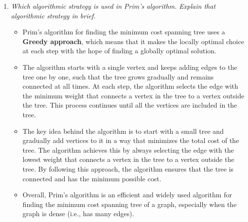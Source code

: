 \documentclass[11pt]{article}
\begin{document}
\begin{enumerate}
    \item \textit{ Which algorithmic strategy is used in Prim's algorithm. Explain that algorithmic strategy in brief.}\\

          \begin{itemize}
              \item Prim's algorithm for finding the minimum cost spanning tree uses a \textbf{Greedy approach}, which means that it makes the locally optimal choice at each step with the hope of finding a globally optimal solution.

              \item  The algorithm starts with a single vertex and keeps adding edges to the tree one by one, such that the tree grows gradually and remains connected at all times. At each step, the algorithm selects the edge with the minimum weight that connects a vertex in the tree to a vertex outside the tree. This process continues until all the vertices are included in the tree.

              \item The key idea behind the algorithm is to start with a small tree and gradually add vertices to it in a way that minimizes the total cost of the tree. The algorithm achieves this by always selecting the edge with the lowest weight that connects a vertex in the tree to a vertex outside the tree. By following this approach, the algorithm ensures that the tree is connected and has the minimum possible cost.

              \item Overall, Prim's algorithm is an efficient and widely used algorithm for finding the minimum cost spanning tree of a graph, especially when the graph is dense (i.e., has many edges).
          \end{itemize}
\end{enumerate}
\end{document}
